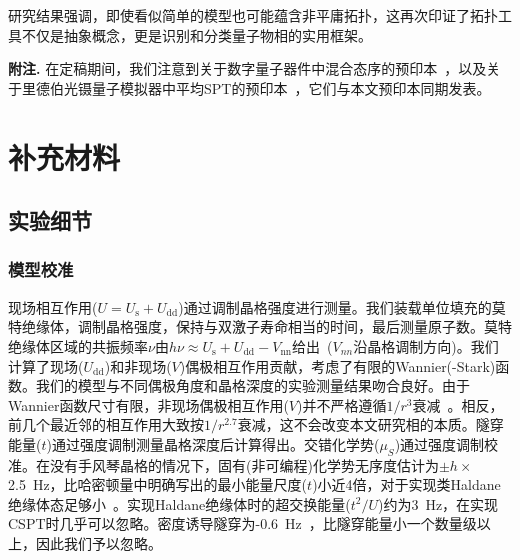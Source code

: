 \documentclass[preprint,superscriptaddress,floatfix,nofootinbib]{revtex4-2}
\begin{document}
研究结果强调，即使看似简单的模型也可能蕴含非平庸拓扑，这再次印证了拓扑工具不仅是抽象概念，更是识别和分类量子物相的实用框架。

\vspace{4pt}

\textbf{附注.} 在定稿期间，我们注意到关于数字量子器件中混合态序的预印本~\cite{Zhang2025}，以及关于里德伯光镊量子模拟器中平均SPT的预印本~\cite{Yue2025}，它们与本文预印本同期发表。
\section*{补充材料}


\subsection*{实验细节}


\subsubsection*{模型校准}

现场相互作用($U=U_\textrm{s}+U_\textrm{dd}$)通过调制晶格强度进行测量。我们装载单位填充的莫特绝缘体，调制晶格强度，保持与双激子寿命相当的时间，最后测量原子数。莫特绝缘体区域的共振频率$\nu$由$h\nu\approx U_\textrm{s}+U_\textrm{dd}-V_\textrm{nn}$给出~\cite{Chomaz2016}($V_{nn}$沿晶格调制方向)。我们计算了现场($U_\textrm{dd}$)和非现场($V$)偶极相互作用贡献，考虑了有限的Wannier(-Stark)函数。我们的模型与不同偶极角度和晶格深度的实验测量结果吻合良好。由于Wannier函数尺寸有限，非现场偶极相互作用($V$)并不严格遵循$1/r^3$衰减~\cite{Wall2013}。相反，前几个最近邻的相互作用大致按$1/r^{2.7}$衰减，这不会改变本文研究相的本质。隧穿能量($t$)通过强度调制测量晶格深度后计算得出。交错化学势($\mu_S$)通过强度调制校准。在没有手风琴晶格的情况下，固有(非可编程)化学势无序度估计为$\pm h\times$ 2.5~Hz，比哈密顿量中明确写出的最小能量尺度($t$)小近4倍，对于实现类Haldane绝缘体态足够小~\cite{Deng2013, Lv2018}。实现Haldane绝缘体时的超交换能量($t^2/U$)约为3~Hz，在实现CSPT时几乎可以忽略。密度诱导隧穿为-0.6~Hz~\cite{Baier2016}，比隧穿能量小一个数量级以上，因此我们予以忽略。
\end{document}

